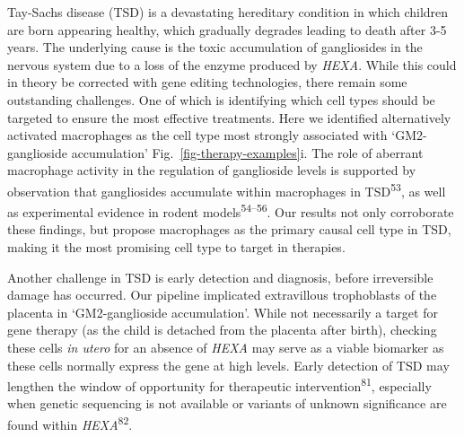 \documentclass[
]{article}
\begin{document}
Tay-Sachs disease (TSD) is a devastating hereditary condition in which
children are born appearing healthy, which gradually degrades leading to
death after 3-5 years. The underlying cause is the toxic accumulation of
gangliosides in the nervous system due to a loss of the enzyme produced
by \emph{HEXA}. While this could in theory be corrected with gene
editing technologies, there remain some outstanding challenges. One of
which is identifying which cell types should be targeted to ensure the
most effective treatments. Here we identified alternatively activated
macrophages as the cell type most strongly associated with
`GM2-ganglioside accumulation' Fig.~\ref{fig-therapy-examples}i. The
role of aberrant macrophage activity in the regulation of ganglioside
levels is supported by observation that gangliosides accumulate within
macrophages in TSD\textsuperscript{53}, as well as experimental evidence
in rodent models\textsuperscript{54--56}. Our results not only
corroborate these findings, but propose macrophages as the primary
causal cell type in TSD, making it the most promising cell type to
target in therapies.

Another challenge in TSD is early detection and diagnosis, before
irreversible damage has occurred. Our pipeline implicated extravillous
trophoblasts of the placenta in `GM2-ganglioside accumulation'. While
not necessarily a target for gene therapy (as the child is detached from
the placenta after birth), checking these cells \emph{in utero} for an
absence of \emph{HEXA} may serve as a viable biomarker as these cells
normally express the gene at high levels. Early detection of TSD may
lengthen the window of opportunity for therapeutic
intervention\textsuperscript{81}, especially when genetic sequencing is
not available or variants of unknown significance are found within
\emph{HEXA}\textsuperscript{82}.
\end{document}
